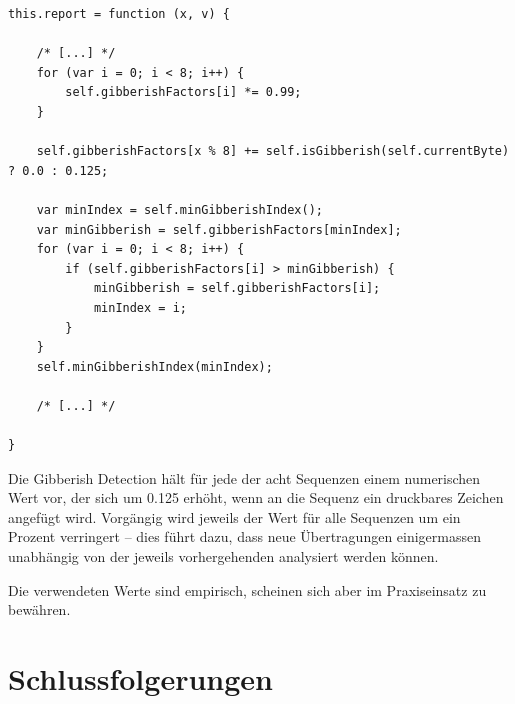 \documentclass[11pt]{scrreprt} %
\theoremstyle{definition}
\begin{document}
\begin{lstlisting}
this.report = function (x, v) {
	
	/* [...] */
	for (var i = 0; i < 8; i++) {
		self.gibberishFactors[i] *= 0.99;
	}

	self.gibberishFactors[x % 8] += self.isGibberish(self.currentByte) ? 0.0 : 0.125;
		
	var minIndex = self.minGibberishIndex();
	var minGibberish = self.gibberishFactors[minIndex];
	for (var i = 0; i < 8; i++) {
		if (self.gibberishFactors[i] > minGibberish) {
			minGibberish = self.gibberishFactors[i];
			minIndex = i;
		}
	}
	self.minGibberishIndex(minIndex);

	/* [...] */

}
\end{lstlisting}

Die Gibberish Detection hält für jede der acht Sequenzen einem numerischen Wert vor, der sich um 0.125 erhöht, wenn an die Sequenz ein druckbares Zeichen angefügt wird. Vorgängig wird jeweils der Wert für alle Sequenzen um ein Prozent verringert -- dies führt dazu, dass neue Übertragungen einigermassen unabhängig von der jeweils vorhergehenden analysiert werden können.

Die verwendeten Werte sind empirisch, scheinen sich aber im Praxiseinsatz zu bewähren.

\chapter{Schlussfolgerungen}



\end{document}
